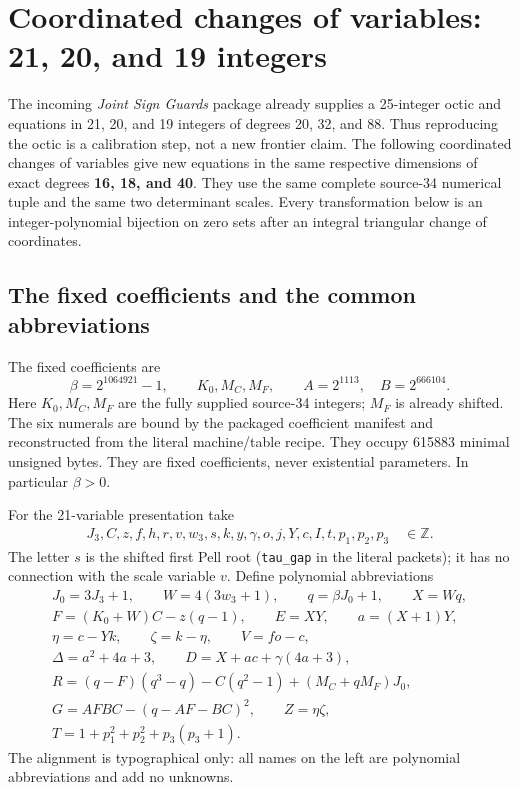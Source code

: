 \section{Coordinated changes of variables: 21, 20, and 19 integers}
\label{sec:coordinated}

The incoming \emph{Joint Sign Guards} package already supplies a
25-integer octic and equations in 21, 20, and 19 integers of degrees
20, 32, and 88. Thus reproducing the octic is a calibration step, not
a new frontier claim. The following coordinated changes of variables
give new equations in the same respective dimensions of exact degrees
\textbf{16, 18, and 40}. They use the same complete source-34 numerical
tuple and the same two determinant scales. Every transformation below
is an integer-polynomial bijection on zero sets after an integral
triangular change of coordinates.

\subsection{The fixed coefficients and the common abbreviations}

The fixed coefficients are
\[
 \beta=2^{1064921}-1,\qquad K_0,M_C,M_F,\qquad
 A=2^{1113},\quad B=2^{666104}.
\]
Here $K_0,M_C,M_F$ are the fully supplied source-34 integers;
$M_F$ is already shifted. The six numerals are bound by the packaged
coefficient manifest and reconstructed from the literal machine/table
recipe. They occupy 615883 minimal unsigned bytes. They are fixed
coefficients, never existential parameters. In particular $\beta>0$.

For the 21-variable presentation take
\[
\begin{gathered}
 J_3,C,z,f,h,r,v,w_3,s,k,y,\gamma,o,j,Y,c,I,t,p_1,p_2,p_3
 \quad\in\mathbb Z.
\end{gathered}
\]
The letter $s$ is the shifted first Pell root (\texttt{tau\_gap} in the
literal packets); it has no connection with the scale variable $v$.
Define polynomial abbreviations
\begin{gather*}
 J_0=3J_3+1,\qquad W=4(3w_3+1),\qquad q=\beta J_0+1,\qquad X=Wq,\\
 F=(K_0+W)C-z(q-1),\qquad E=XY,\qquad a=(X+1)Y,\\
 \eta=c-Yk,\qquad\zeta=k-\eta,\qquad V=fo-c,\\
 \Delta=a^2+4a+3,\qquad D=X+ac+\gamma(4a+3),\\
 R=(q-F)(q^3-q)-C(q^2-1)+(M_C+qM_F)J_0,\\
 G=AFBC-(q-AF-BC)^2,\qquad Z=\eta\zeta,\\
 T=1+p_1^2+p_2^2+p_3(p_3+1).
\end{gather*}
The alignment is typographical only: all names on the left are
polynomial abbreviations and add no unknowns.


